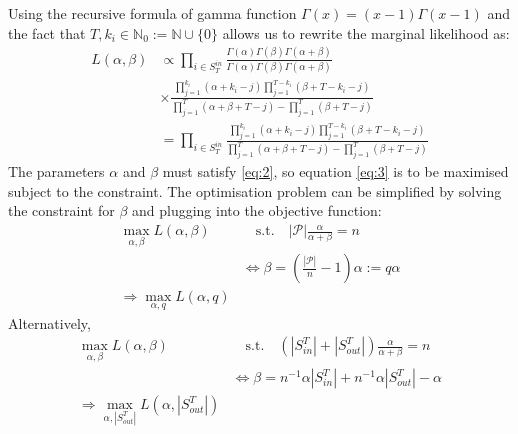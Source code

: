 \documentclass[a4paper, 12pt]{article}
\newcommand{\sout}{|S_{out}^T|}
\newcommand{\sint}{|S_{in}^T|}
\begin{document}
Using the recursive formula of gamma function $\Gamma(x) = (x - 1)\Gamma(x - 1)$ and the fact that $T, k_i \in \mathbb{N}_0 := \mathbb{N} \cup \{0\}$ allows us to rewrite the marginal likelihood as:
\begin{align*}
    L(\alpha, \beta) &\propto \prod_{i \in S_T^{in}} \frac{\Gamma(\alpha) \Gamma(\beta) \Gamma(\alpha + \beta)}{\Gamma(\alpha)\Gamma(\beta)\Gamma(\alpha + \beta)}\\
    &\times \frac{\prod_{j=1}^{k_i} (\alpha + k_i - j)\prod_{j=1}^{T - k_i} (\beta + T - k_i - j)}{\prod_{j=1}^T(\alpha + \beta + T - j) - \prod_{j=1}^T (\beta + T - j)} \\
    &= \prod_{i \in S_T^{in}} \frac{\prod_{j=1}^{k_i} (\alpha + k_i - j)\prod_{j=1}^{T - k_i} (\beta + T - k_i - j)}{\prod_{j=1}^T(\alpha + \beta + T - j) - \prod_{j=1}^T (\beta + T - j)} 
\end{align*}
The parameters $\alpha$ and $\beta$ must satisfy \eqref{eq:2}, so equation \eqref{eq:3} is to be maximised subject to the constraint. The optimisation problem can be simplified by solving the constraint for $\beta$ and plugging into the objective function:
\begin{align*}
    \max_{\alpha, \beta} L(\alpha, \beta) &\quad \text{s.t.} \quad |\mathcal{P}|\frac{\alpha}{\alpha + \beta} = n \\
    &\Leftrightarrow \beta = \left(\frac{|\mathcal{P}|}{n} - 1 \right)\alpha := q\alpha\\
    \Rightarrow \max_{\alpha, q} L(\alpha, q) &
\end{align*}
Alternatively,
\begin{align*}
    \max_{\alpha, \beta} L(\alpha, \beta) &\quad \text{s.t.} \quad (\sint + \sout)\frac{\alpha}{\alpha + \beta} = n \\
    &\Leftrightarrow \beta = n^{-1}\alpha\sint + n^{-1}\alpha\sout - \alpha\\
    \Rightarrow \max_{\alpha, \sout} L(\alpha, \sout) &
\end{align*}
\end{document}
